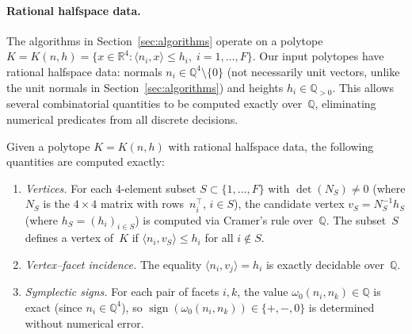 %
%
%


\paragraph{Rational halfspace data.}
The algorithms in Section~\ref{sec:algorithms} operate on a polytope
$K = K(n, h) = \{x \in \mathbb{R}^4 : \langle n_i, x \rangle \leq h_i,
\; i = 1, \ldots, F\}$.
Our input polytopes have rational halfspace data:
normals $n_i \in \mathbb{Q}^4 \setminus \{0\}$
(not necessarily unit vectors, unlike the unit normals
in Section~\ref{sec:algorithms})
and heights $h_i \in \mathbb{Q}_{>0}$.
This allows several combinatorial quantities to be
computed exactly over~$\mathbb{Q}$, eliminating
numerical predicates from all discrete decisions.

\begin{remark}%
\label{rem:exact-quantities}
Given a polytope $K = K(n, h)$ with rational halfspace data,
the following quantities are computed exactly:
\begin{enumerate}
\item \emph{Vertices.}
  For each 4-element subset $S \subset \{1, \ldots, F\}$
  with $\det(N_S) \neq 0$ (where $N_S$ is the $4 \times 4$
  matrix with rows~$n_i^\top$, $i \in S$),
  the candidate vertex $v_S = N_S^{-1} h_S$
  (where $h_S = (h_i)_{i \in S}$) is computed
  via Cramer's rule over~$\mathbb{Q}$.
  The subset~$S$ defines a vertex of~$K$ if
  $\langle n_i, v_S \rangle \leq h_i$ for all $i \notin S$.
\item \emph{Vertex--facet incidence.}
  The equality $\langle n_i, v_j \rangle = h_i$
  is exactly decidable over~$\mathbb{Q}$.
\item \emph{Symplectic signs.}
  For each pair of facets $i, k$,
  the value $\omega_0(n_i, n_k) \in \mathbb{Q}$
  is exact (since $n_i \in \mathbb{Q}^4$),
  so $\operatorname{sign}(\omega_0(n_i, n_k))
  \in \{+, -, 0\}$ is determined without
  numerical error.
\end{enumerate}
\end{remark}

